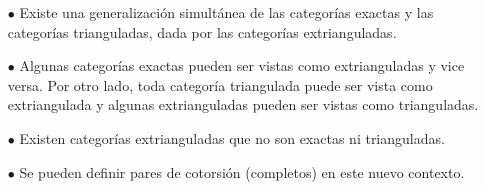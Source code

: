 \documentclass[preview]{standalone}
\begin{document}
\begin{center}
\begin{itemize}
                        \item[$\bullet$] Existe una generalización simultánea de las categorías exactas y las categorías trianguladas, dada por las categorías extrianguladas.
                        \item[$\bullet$] Algunas categorías exactas pueden ser vistas como extrianguladas y vice versa. Por otro lado, toda categoría triangulada puede ser vista como extriangulada y algunas extrianguladas pueden ser vistas como trianguladas.
                        \item[$\bullet$] Existen categorías extrianguladas que no son exactas ni trianguladas.
                        \item[$\bullet$] Se pueden definir pares de cotorsión (completos) en este nuevo contexto.
                    \end{itemize}
\end{center}
\end{document}
